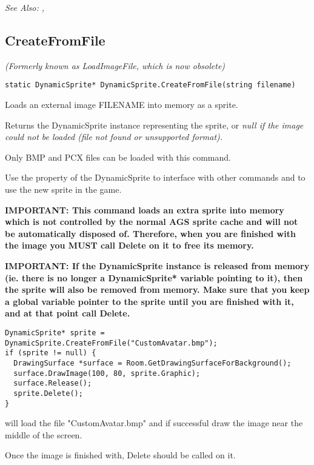 \it{See Also:} ,


\subsection{CreateFromFile}\label{DynamicSprite.CreateFromFile}%

\it{(Formerly known as LoadImageFile, which is now obsolete)}

\begin{verbatim}
static DynamicSprite* DynamicSprite.CreateFromFile(string filename)
\end{verbatim}
Loads an external image FILENAME into memory as a sprite.

Returns the DynamicSprite instance representing the sprite, or \it{null} if the image
could not be loaded (file not found or unsupported format).

Only BMP and PCX files can be loaded with this command.

Use the  property of the DynamicSprite to
interface with other commands and to use the new sprite in the game.

\bf{IMPORTANT:} This command loads an extra sprite into memory which is not controlled
by the normal AGS sprite cache and will not be automatically disposed of. Therefore, when
you are finished with the image you \bf{MUST} call Delete on it to free its memory.

\bf{IMPORTANT:} If the DynamicSprite instance is released from memory (ie. there is
no longer a DynamicSprite* variable pointing to it), then the sprite will also be
removed from memory. Make sure that you keep a global variable pointer to the sprite
until you are finished with it, and at that point call Delete.

\begin{verbatim}
DynamicSprite* sprite = DynamicSprite.CreateFromFile("CustomAvatar.bmp");
if (sprite != null) {
  DrawingSurface *surface = Room.GetDrawingSurfaceForBackground();
  surface.DrawImage(100, 80, sprite.Graphic);
  surface.Release();
  sprite.Delete();
}
\end{verbatim}
will load the file "CustomAvatar.bmp" and if successful draw the image near the middle
of the screen.

Once the image is finished with, Delete should be called on it.

